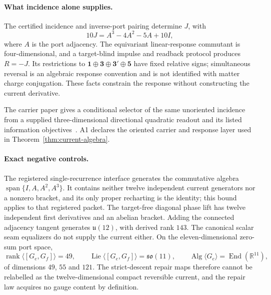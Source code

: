 \documentclass[11pt]{article}
\begin{document}
\paragraph{What incidence alone supplies.}
\label{thm:echosahedral-source-selector}
The certified incidence and inverse-port pairing determine \(J\), with
\[
10J=A^3-4A^2-5A+10I,
\]
where \(A\) is the port adjacency. The equivariant linear-response commutant
is four-dimensional, and a target-blind impulse and readback protocol
produces \(R=-J\). Its restrictions to
\(\mathbf1\oplus\mathbf3\oplus\mathbf3'\oplus\mathbf5\) have fixed relative
signs; simultaneous reversal is an algebraic response convention and is not
identified with matter charge conjugation. These facts constrain the
response without constructing the current derivative.

The carrier paper gives a conditional selector of the same unoriented incidence from
a supplied three-dimensional directional quadratic readout and its listed information
objectives~\cite{ophmicrophysics}. A1 declares the oriented carrier and response layer
used in Theorem~\ref{thm:current-algebra}.

\paragraph{Exact negative controls.}
The registered single-recurrence interface generates the commutative algebra
\(\operatorname{span}\{I,A,A^2,A^3\}\). It contains neither twelve
independent current generators nor a nonzero bracket, and its only proper
recharting is the identity; this bound applies to that registered packet. The
target-free diagonal phase lift has twelve independent first derivatives and
an abelian bracket. Adding the connected adjacency tangent generates
\(\mathfrak u(12)\), with derived rank \(143\). The canonical scalar seam
equalizers do not supply the current either. On the eleven-dimensional
zero-sum port space,
\[
 \operatorname{rank}\langle [G_e,G_f]\rangle=49,
 \qquad
 \operatorname{Lie}\langle [G_e,G_f]\rangle=\mathfrak{so}(11),
 \qquad
 \operatorname{Alg}\langle G_e\rangle=\operatorname{End}(\mathbb R^{11}),
\]
of dimensions \(49\), \(55\) and \(121\). The strict-descent repair maps
therefore cannot be relabelled as the twelve-dimensional compact reversible
current, and the repair law acquires no gauge content by definition.
\end{document}
